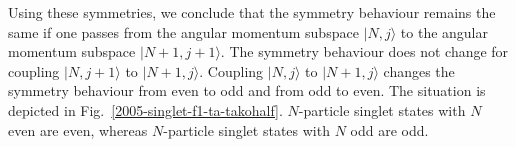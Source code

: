 \documentclass[rmp,amsfonts,showpacs,showkeys,preprint]{revtex4}
\begin{document}
Using these symmetries, we conclude that the symmetry behaviour
remains the same if one passes from the angular momentum subspace
$|N,j\rangle$ to the angular momentum subspace $|N+1,j+1\rangle$.
The symmetry behaviour does not change for coupling $|N,j+1\rangle$
to $|N+1,j\rangle$.
Coupling $|N,j\rangle$ to $|N+1,j\rangle$ changes the symmetry behaviour from even to
odd and from odd to even.
The situation is depicted in
Fig.~\ref{2005-singlet-f1-ta-takohalf}.
$N$-particle singlet states with $N$ even are even,
whereas $N$-particle singlet states with $N$ odd are odd.
\end{document}
